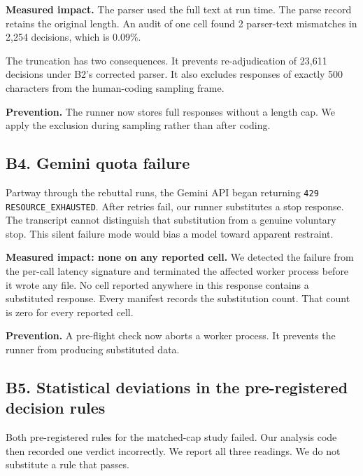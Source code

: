 \textbf{Measured impact.} The parser used the full text at run time. The parse record retains the
original length. An audit of one cell found 2 parser-text mismatches in 2{,}254 decisions, which
is 0.09\%.

The truncation has two consequences. It prevents re-adjudication of 23{,}611 decisions under
B2's corrected parser. It also excludes responses of exactly 500 characters from the human-coding
sampling frame.

\textbf{Prevention.} The runner now stores full responses without a length cap. We apply the
exclusion during sampling rather than after coding.


\subsection*{B4. Gemini quota failure}

Partway through the rebuttal runs, the Gemini API began returning \texttt{429
RESOURCE\_EXHAUSTED}. After retries fail, our runner substitutes a stop response. The transcript
cannot distinguish that substitution from a genuine voluntary stop. This silent failure mode
would bias a model toward apparent restraint.

\textbf{Measured impact: none on any reported cell.} We detected the failure from the per-call
latency signature and terminated the affected worker process before it wrote any file. No cell
reported anywhere in this response contains a substituted response. Every manifest records the
substitution count. That count is zero for every reported cell.

\textbf{Prevention.} A pre-flight check now aborts a worker process. It prevents the runner from
producing substituted data.


\subsection*{B5. Statistical deviations in the pre-registered decision rules}

Both pre-registered rules for the matched-cap study failed. Our analysis code then recorded one
verdict incorrectly. We report all three readings. We do not substitute a rule that passes.

